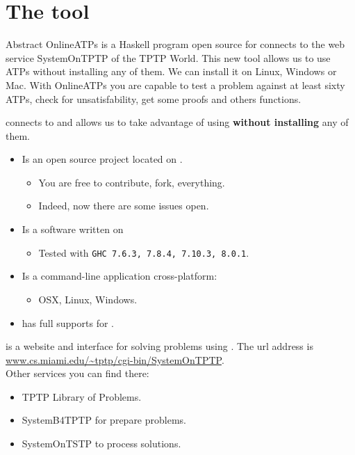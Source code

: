 \documentclass[newPxFont]{beamer}
\begin{document}
\maketitle

% 


\section{The tool}

\begin{frame}{Abstract}
OnlineATPs is a Haskell program open source for connects to the web service SystemOnTPTP of the TPTP World.
This new tool allows us to use ATPs without installing any of them. We can install it on Linux, Windows or Mac.
With OnlineATPs you are capable to test a problem against at least sixty ATPs, check for unsatisfability, get some proofs and others functions.
\end{frame}

\begin{frame}

\onlineatps connects to \alert{\systemontptp} and allows us to take
advantage of using \alert{\atps} \textbf{without installing} any of them.
\begin{itemize}
\item Is an open source project located on .
\begin{itemize}
  \item You are free to contribute, fork, everything.
  \item Indeed, now there are some issues open.
  \end{itemize}
\item Is a software written on 
\begin{itemize}
  \item Tested with \texttt{GHC 7.6.3, 7.8.4, 7.10.3, 8.0.1}.
  \end{itemize}
\item Is a command-line application cross-platform:
\begin{itemize}
  \item OSX, Linux, Windows.
\end{itemize}
\item \apia has full supports for \onlineatps.
\end{itemize}
\end{frame}

\begin{frame}
\systemontptp is a website and interface for solving problems using \atps.
The url address is \url{www.cs.miami.edu/~tptp/cgi-bin/SystemOnTPTP}.\\
Other services you can find there:
\begin{itemize}
\item TPTP Library of Problems.
\item SystemB4TPTP for prepare problems.
\item SystemOnTSTP to process solutions.
\end{itemize}
\end{frame}
\end{document}
